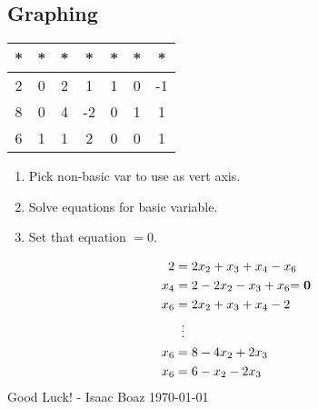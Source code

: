 \documentclass[10pt]{article}
\begin{document}
\begin{multicols*}{2}
\begin{minipage}{\columnwidth}
        \subsection*{Graphing}
        \begin{minipage}{0.4\columnwidth}
            \begin{tabular}{c|cccccc}
                * & * & * & *  & * & * & *  \\
                \hline
                2 & 0 & 2 & 1  & 1 & 0 & -1 \\
                8 & 0 & 4 & -2 & 0 & 1 & 1  \\
                6 & 1 & 1 & 2  & 0 & 0 & 1
            \end{tabular}
        \end{minipage}
        \columnbreak
        \begin{minipage}{0.7\columnwidth}
            \begin{enumerate}
                \item Pick non-basic var to use as vert axis.
                \item Solve equations for basic variable.
                \item Set that equation \(= 0\).
            \end{enumerate}
        \end{minipage}
        \begin{align*}
            2   & = 2x_2 + x_3 + x_4 - x_6                \\
            x_4 & = 2 - 2x_2 - x_3 + x_6 \mathbf{= 0}     \\
            x_6 & = 2x_2 + x_3 + x_4 - 2                  \\
                & \mathrel{\makebox[\widthof{=}]{\vdots}} \\
            x_6 & = 8 - 4x_2 + 2x_3                       \\
            x_6 & = 6 - x_2 - 2x_3
        \end{align*}
        Good Luck! - Isaac Boaz \today
    \end{minipage}
    \columnbreak \\
    \begin{minipage}{\columnwidth}

\end{minipage}
\end{multicols*}
\end{document}
